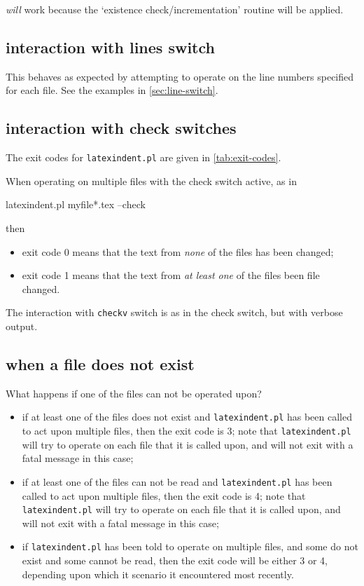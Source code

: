 \documentclass[10pt]{article}
\begin{document}
  \emph{will} work because the `existence check/incrementation' routine will be applied.

 \subsection{interaction with lines switch}
  This behaves as expected by attempting to operate on the line numbers specified for each file. See
  the examples in \cref{sec:line-switch}.

 \subsection{interaction with check switches}
  The exit codes for \texttt{latexindent.pl} are given in \vref{tab:exit-codes}.

  When operating on multiple files with the check switch active, as in

  \begin{commandshell}
latexindent.pl myfile*.tex --check
        \end{commandshell}

  then
  \begin{itemize}
   \item exit code 0 means that the text from \emph{none} of the files has been changed;
   \item exit code 1 means that the text from \emph{at least one} of the files been file
         changed.
  \end{itemize}

  The interaction with \texttt{checkv} switch is as in the check switch, but with verbose
  output.

 \subsection{when a file does not exist}
  What happens if one of the files can not be operated upon?
  \begin{itemize}
   \item if at least one of the files does not exist and \texttt{latexindent.pl} has been
         called to act upon multiple files, then the exit code is 3; note that
         \texttt{latexindent.pl} will try to operate on each file that it is called upon,
         and will not exit with a fatal message in this case;
   \item if at least one of the files can not be read and \texttt{latexindent.pl} has
         been called to act upon multiple files, then the exit code is 4; note that
         \texttt{latexindent.pl} will try to operate on each file that it is called upon,
         and will not exit with a fatal message in this case;
   \item if \texttt{latexindent.pl} has been told to operate on multiple files, and some
         do not exist and some cannot be read, then the exit code will be either 3 or 4,
         depending upon which it scenario it encountered most recently.
  \end{itemize}
\end{document}
